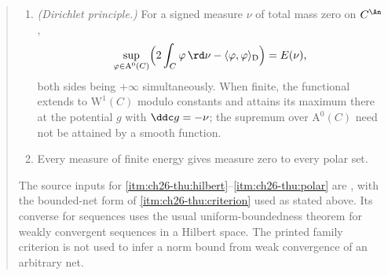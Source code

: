 \begin{quote}
\begin{enumerate}
\item\label{itm:ch26-thu:dirichlet-principle}
 \emph{(Dirichlet principle.)}  For a signed measure $\nu$ of total mass
 zero on $C^{\An}$,
 \begin{equation}
 \label{eq:ch26-thuillier-dirichlet-principle}
  \sup_{\varphi\in\mathrm A^0(C)}
   \Bigl(2\int_C\varphi\,\rd\nu
         -\langle\varphi,\varphi\rangle_{\mathrm D}\Bigr)
 =E(\nu),
 \end{equation}
 both sides being $+\infty$ simultaneously.  When finite, the functional
 extends to $\mathrm W^1(C)$ modulo constants and attains its maximum there
 at the potential $g$ with $\ddc g=-\nu$; the supremum over
 $\mathrm A^0(C)$ need not be attained by a smooth function.
\item\label{itm:ch26-thu:polar}
 Every measure of finite energy gives measure zero to every polar set.
\end{enumerate}
The source inputs for
\cref{itm:ch26-thu:hilbert}--\cref{itm:ch26-thu:polar} are
\cite[Proposition~3.5.2, Lemma~3.5.3, Propositions~3.5.7,
3.5.9, 3.5.10 and
Th\'eor\`eme~3.5.11]{Thu05}, with the bounded-net form of
\cref{itm:ch26-thu:criterion} used as stated above.  Its converse for
sequences uses the usual uniform-boundedness theorem for weakly convergent
sequences in a Hilbert space.  The printed family criterion is not used to
infer a norm bound from weak convergence of an arbitrary net.
\end{quote}

